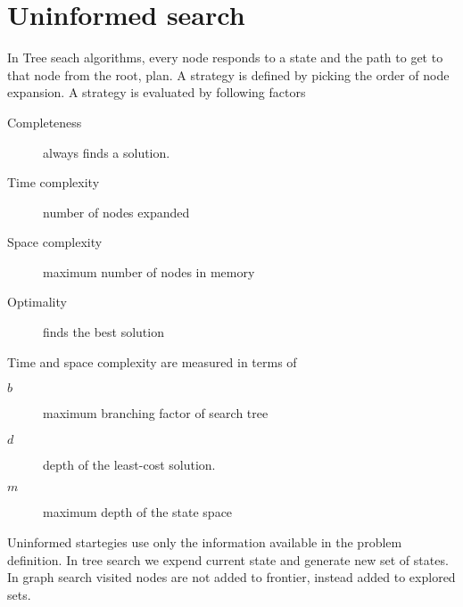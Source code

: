 \section{Uninformed search}
In Tree seach algorithms, every node responds to a state and the path to get to that node from the root, plan. A strategy is defined by picking the order of node expansion. A strategy is evaluated by following factors
\begin{description}
    \item[Completeness] always finds a solution.
    \item[Time complexity] number of nodes expanded
    \item[Space complexity] maximum number of nodes in memory
    \item[Optimality] finds the best solution
\end{description}
Time and space complexity are measured in terms of
\begin{description}
    \item[\(b\)] maximum branching factor of search tree
    \item[\(d\)] depth of the least-cost solution.
    \item[\(m\)] maximum depth of the state space
\end{description}
Uninformed startegies use only the information available in the problem definition. In tree search we expend current state and generate new set of states. In graph search visited nodes are not added to frontier, instead added to explored sets.
